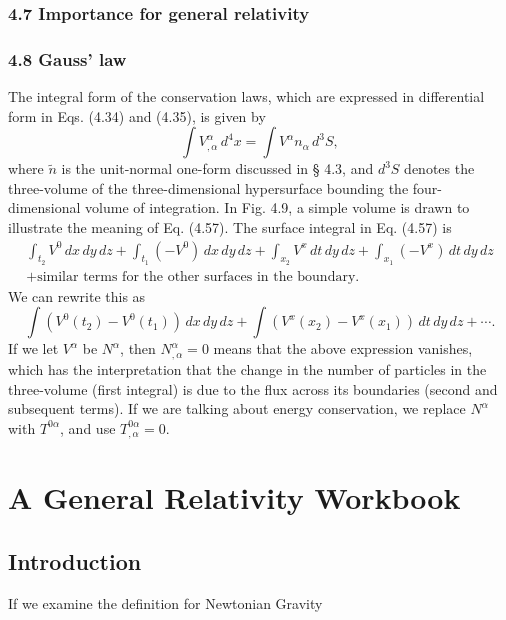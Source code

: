 \documentclass[12pt]{book}
\begin{document}
    \subsection{4.7 Importance for general relativity}
    
    \subsection{4.8 Gauss' law}

    The integral form of the conservation laws, which are expressed in differential form in Eqs. (4.34) and (4.35), is given by
    \[
    \int V^\alpha_{,\alpha} \, d^4x = \int V^\alpha n_\alpha \, d^3 S, \tag{4.57}
    \]
    where \(\tilde{n}\) is the unit-normal one-form discussed in § 4.3, and \(d^3 S\) denotes the three-volume of the three-dimensional hypersurface bounding the four-dimensional volume of integration. In Fig. 4.9, a simple volume is drawn to illustrate the meaning of Eq. (4.57). The surface integral in Eq. (4.57) is
    \begin{align}
    \int_{t_2} V^0 \, dx \, dy \, dz + \int_{t_1} (-V^0) \, dx \, dy \, dz + \int_{x_2} V^x \, dt \, dy \, dz + \int_{x_1} (-V^x) \, dt \, dy \, dz
    \\
    + \text{similar terms for the other surfaces in the boundary}.
    \end{align}
    We can rewrite this as
    \[
    \int \left( V^0(t_2) - V^0(t_1) \right) \, dx \, dy \, dz + \int \left( V^x(x_2) - V^x(x_1) \right) \, dt \, dy \, dz + \cdots. \tag{4.58}
    \]
    If we let \(V^\alpha\) be \(N^\alpha\), then \(N^\alpha_{,\alpha} = 0\) means that the above expression vanishes, which has the interpretation that the change in the number of particles in the three-volume (first integral) is due to the flux across its boundaries (second and subsequent terms). If we are talking about energy conservation, we replace \(N^\alpha\) with \(T^{0\alpha}\), and use \(T^{0\alpha}_{,\alpha} = 0\).
    
    
    


\chapter{A General Relativity Workbook}
\section{Introduction}
If we examine the definition for Newtonian Gravity




        
\end{document}
